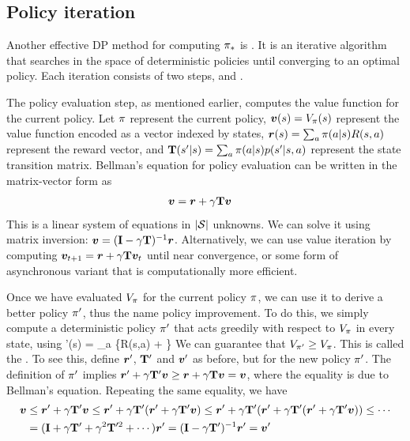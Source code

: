 \subsection{Policy iteration}
\label{sec:policyIteration}

Another effective DP method for computing $\pi_{*}$ is .
It is an iterative algorithm that searches in the space
of deterministic policies until converging to an optimal policy.
Each iteration consists of two steps,  and .

The policy evaluation step, as mentioned earlier,
computes the value function for the current policy.
Let $\pi$ represent the current policy,
${\bm{v}}(s)=V_{\pi}(s)$ represent the value function encoded as a vector indexed by states,
${\bm{r}}(s) = \sum_a \pi(a|s) R(s,a)$ represent the reward vector,
and $\mathbf{T}(s'|s) = \sum_a \pi(a|s) p(s'|s,a)$ 
represent the state transition matrix.
Bellman's equation for policy evaluation can be
written in the matrix-vector form as
\begin{align}
  {\bm{v}} &= {\bm{r}} + \gamma \mathbf{T} {\bm{v}}
  \label{eqn:policyEval}
  \end{align}
This is a linear system of equations in $|\cal{S}|$ unknowns.
We can solve it using matrix inversion:
${\bm{v}} = (\mathbf{I} - \gamma \mathbf{T})^{-1} {\bm{r}}$.
Alternatively, we can use value iteration
by computing
${\bm{v}}_{t+1} = {\bm{r}} + \gamma \mathbf{T} {\bm{v}}_t$
until near convergence,
or some form of asynchronous variant
that is computationally more efficient.

Once we have evaluated $V_{\pi}$ for the current policy $\pi$,
we can use it to derive a better policy $\pi'$,
thus the name policy improvement.
To do this, we simply compute a deterministic
policy $\pi'$ that acts greedily with respect to $V_{\pi}$ in every
state, using
\be
\policy'(s) = \argmax_a \{R(s,a) + \gamma {}\}
\ee
We can guarantee that $V_{\pi'} \ge V_{\pi}$.
This is called the .
To see this, define ${\bm{r}}'$, $\mathbf{T}'$ and ${\bm{v}}'$ as before,
but for the new policy $\pi'$.
The definition of $\pi'$ implies
${\bm{r}}' + \gamma \mathbf{T}' {\bm{v}} \ge {\bm{r}} + \gamma \mathbf{T} {\bm{v}} = {\bm{v}}$,
where the equality is due to Bellman's equation.
Repeating the same equality, we have
\begin{align}
{\bm{v}} &\le {\bm{r}}' + \gamma \mathbf{T}' {\bm{v}}
\le {\bm{r}}' + \gamma \mathbf{T}' ({\bm{r}}' + \gamma \mathbf{T}' {\bm{v}})
\le {\bm{r}}' + \gamma \mathbf{T}' ({\bm{r}}' + \gamma \mathbf{T}' ({\bm{r}}' + \gamma \mathbf{T}' {\bm{v}}) ) \le \cdots \\
&= (\mathbf{I} + \gamma \mathbf{T}' + \gamma^2 \mathbf{T}'^2 + \cdots) {\bm{r}}'
= (\mathbf{I} - \gamma \mathbf{T}')^{-1} {\bm{r}}'
= {\bm{v}}'
\end{align}

